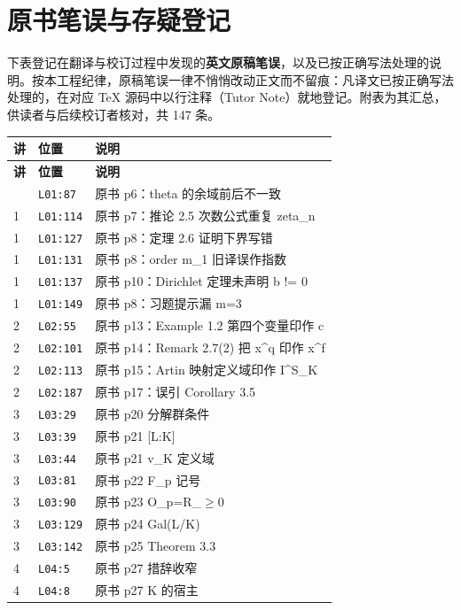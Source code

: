 \chapter{原书笔误与存疑登记}
\begingroup\small{}
下表登记在翻译与校订过程中发现的\textbf{英文原稿笔误}，以及已按正确写法处理的说明。按本工程纪律，原稿笔误一律不悄悄改动正文而不留痕：凡译文已按正确写法处理的，在对应 TeX 源码中以行注释（Tutor Note）就地登记。附表为其汇总，供读者与后续校订者核对，共 147 条。

\begin{longtable}{@{}p{1.0cm}p{2.2cm}p{10.6cm}@{}}
\toprule
\textbf{讲} & \textbf{位置} & \textbf{说明} \\
\midrule
\endfirsthead
\toprule
\textbf{讲} & \textbf{位置} & \textbf{说明} \\
\midrule
\endhead
\bottomrule
\endfoot
1 & \texttt{L01:87} & 原书 p6：theta 的余域前后不一致 \\
1 & \texttt{L01:114} & 原书 p7：推论 2.5 次数公式重复 zeta\_n \\
1 & \texttt{L01:127} & 原书 p8：定理 2.6 证明下界写错 \\
1 & \texttt{L01:131} & 原书 p8：order m\_1 旧译误作指数 \\
1 & \texttt{L01:137} & 原书 p10：Dirichlet 定理未声明 b != 0 \\
1 & \texttt{L01:149} & 原书 p8：习题提示漏 m=3 \\
2 & \texttt{L02:55} & 原书 p13：Example 1.2 第四个变量印作 c \\
2 & \texttt{L02:101} & 原书 p14：Remark 2.7(2) 把 x\^{}q 印作 x\^{}f \\
2 & \texttt{L02:113} & 原书 p15：Artin 映射定义域印作 I\^{}S\_K \\
2 & \texttt{L02:187} & 原书 p17：误引 Corollary 3.5 \\
3 & \texttt{L03:29} & 原书 p20 分解群条件 \\
3 & \texttt{L03:39} & 原书 p21 [L:K] \\
3 & \texttt{L03:44} & 原书 p21 v\_K 定义域 \\
3 & \texttt{L03:81} & 原书 p22 F\_p 记号 \\
3 & \texttt{L03:90} & 原书 p23 O\_p=R\_{$\ge$0} \\
3 & \texttt{L03:129} & 原书 p24 Gal(L/K) \\
3 & \texttt{L03:142} & 原书 p25 Theorem 3.3 \\
4 & \texttt{L04:5} & 原书 p27 措辞收窄 \\
4 & \texttt{L04:8} & 原书 p27 K 的宿主 \\

\end{longtable}
